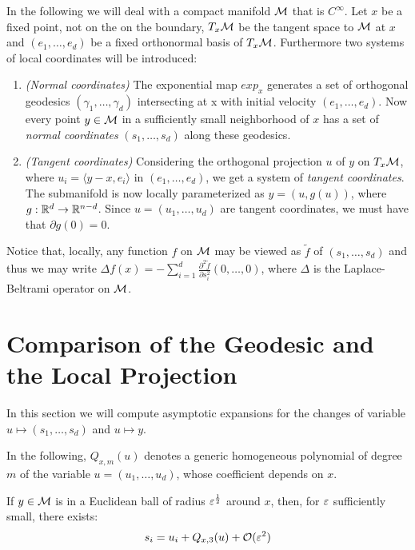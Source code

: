 In the following we will deal with a compact manifold $\mathcal{M}$ that is $C^\infty$. Let $x$ be a fixed point, not on the on the boundary, $T_x\mathcal{M}$ be the tangent space to $\mathcal{M}$ at $x$ and $(e_1,\dots,e_d)$ be a fixed orthonormal basis of $T_x\mathcal{M}$. Furthermore two systems of local coordinates will be introduced:
\begin{enumerate}
\item \textit{(Normal coordinates)} The exponential map $exp_x$ generates a set of orthogonal geodesics $(\gamma_1,\dots,\gamma_d)$ intersecting at x with initial velocity $(e_1,\dots,e_d)$. Now every point $y\in\mathcal{M}$ in a sufficiently small neighborhood of $x$ has a set of \textit{normal coordinates} $(s_1,\dots,s_d)$ along these geodesics.
\item \textit{(Tangent coordinates)} Considering the orthogonal projection $u$ of $y$ on $T_x\mathcal{M}$, where $u_i = \langle y-x,e_i\rangle$ in $(e_1,\dots,e_d)$, we get a system of \textit{tangent coordinates}. The submanifold is now locally parameterized as $y=(u,g(u))$, where $g:\mathbb{R}^d \rightarrow \mathbb{R}^{n-d}$. Since $u=(u_1,\dots,u_d)$ are tangent coordinates, we must have that $\partial g(0)=0$.
\end{enumerate}
Notice that, locally, any function $f$ on $\mathcal{M}$ may be viewed as $\tilde{f}$ of $(s_1,\dots,s_d)$ and thus we may write $\Delta f(x)=-\sum_{i=1}^d \frac{\partial^2\tilde{f}}{\partial s_i^2}(0,\dots,0)$, where $\Delta$ is the Laplace-Beltrami operator on $\mathcal{M}$.




\section{Comparison of the Geodesic and the Local Projection}
In this section we will compute asymptotic expansions for the changes of variable $u\mapsto (s_1,\dots,s_d)$ and $u\mapsto y$.

In the following, $Q_{x,m}(u)$ denotes a generic homogeneous polynomial of degree $m$ of the variable $u = (u_1,\dots,u_d)$, whose coefficient depends on $x$.

\begin{lemma}
If $y\in\mathcal{M}$ is in a Euclidean ball of radius $\varepsilon^\frac{1}{2}$ around $x$, then, for $\varepsilon$ sufficiently small, there exists:
\begin{equation}\label{geodOrder3}
s_i=u_i+Q_{x,3}(u)+\mathcal{O}(\varepsilon^2)
\end{equation}
\end{lemma}


